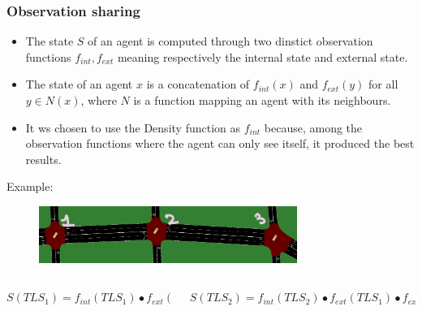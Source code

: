 \documentclass[dvipsnames]{beamer}
\begin{document}
\begin{frame}
\frametitle{Observation sharing}

  {\footnotesize
  \begin{itemize}
    \item The state $S$ of an agent is computed through two dinstict observation functions $f_{int}, f_{ext}$ meaning respectively the internal state and external state. \\
    \item The state of an agent $x$ is a concatenation of $f_{int}(x)$ and $f_{ext}(y)$ for all $y \in N(x)$, where $N$ is a function mapping an agent with its neighbours. \\
    \item It ws chosen to use the Density function as $f_{int}$ because, among the observation functions where the agent can only see itself, it produced the best results.
  \end{itemize}
  }

  Example:
  \begin{figure}
    \centering
    \includegraphics[width=0.75\textwidth]{figures/sumo-rf-tls-triplet.png}
  \end{figure}

  
  \begin{columns}
    \begin{column}{0.4\textwidth}
      \centering
      {\footnotesize$S({TLS}_{1}) = f_{int}({TLS}_{1}) \bullet f_{ext}({TLS}_{2})$}
    \end{column}
    \begin{column}{0.6\textwidth}
      \centering
      {\footnotesize$S({TLS}_{2}) = f_{int}({TLS}_{2}) \bullet f_{ext}({TLS}_{1}) \bullet f_{ext}({TLS}_{3})$}
    \end{column}
  \end{columns}
\end{frame}
\end{document}
